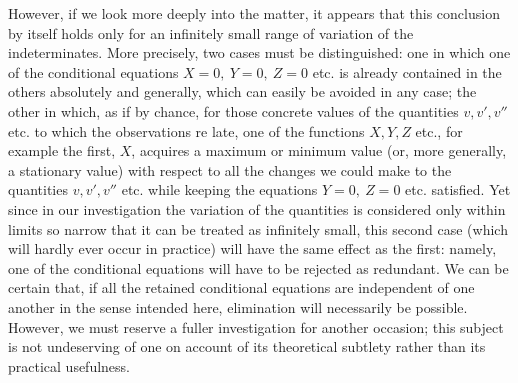 However, if we look more deeply into the matter, it appears that this conclusion by itself holds only for an infinitely small range of variation of the indeterminates. More precisely, two cases must be distinguished: one in which one of the conditional equations \(X=0,\ Y=0,\ Z=0\) etc. is already contained in the others absolutely and generally, which can easily be avoided in any case; the other in which, as if by chance, for those concrete values of the quantities \(v,v',v''\) etc. to which the observations re%
late, one of the functions \(X,Y,Z\) etc., for example the first, \(X\), acquires a maximum or minimum value (or, more generally, a stationary value) with respect to all the changes we could make to the quantities \(v,v',v''\) etc. while keeping the equations \(Y=0,\ Z=0\) etc. satisfied. Yet since in our investigation the variation of the quantities is considered only within limits so narrow that it can be treated as infinitely small, this second case (which will hardly ever occur in practice) will have the same effect as the first: namely, one of the conditional equations will have to be rejected as redundant. We can be certain that, if all the retained conditional equations are independent of one another in the sense intended here, elimination will necessarily be possible. However, we must reserve a fuller investigation for another occasion; this subject is not undeserving of one on account of its theoretical subtlety rather than its practical usefulness.

\clearpage
